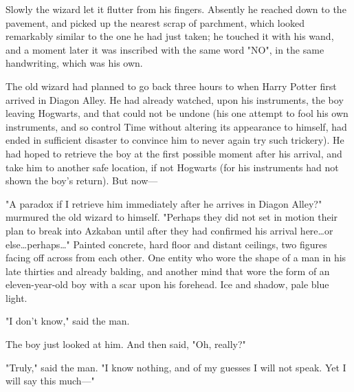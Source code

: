 Slowly the wizard let it flutter from his fingers. Absently he reached down to
the pavement, and picked up the nearest scrap of parchment, which looked
remarkably similar to the one he had just taken; he touched it with his wand,
and a moment later it was inscribed with the same word "NO", in the same
handwriting, which was his own.

The old wizard had planned to go back three hours to when Harry Potter first
arrived in Diagon Alley. He had already watched, upon his instruments, the boy
leaving Hogwarts, and that could not be undone (his one attempt to fool his own
instruments, and so control Time without altering its appearance to himself,
had ended in sufficient disaster to convince him to never again try such
trickery). He had hoped to retrieve the boy at the first possible moment after
his arrival, and take him to another safe location, if not Hogwarts (for his
instruments had not shown the boy's return). But now—

"A paradox if I retrieve him immediately after he arrives in Diagon Alley?"
murmured the old wizard to himself. "Perhaps they did not set in motion their
plan to break into Azkaban until after they had confirmed his arrival here…or
else…perhaps…"
\later
Painted concrete, hard floor and distant ceilings, two figures facing off
across from each other. One entity who wore the shape of a man in his late
thirties and already balding, and another mind that wore the form of an
eleven-year-old boy with a scar upon his forehead. Ice and shadow, pale blue
light.

"I don't know," said the man.

The boy just looked at him. And then said, "Oh, really?"

"Truly," said the man. "I know nothing, and of my guesses I will not speak. Yet
I will say this much—"
